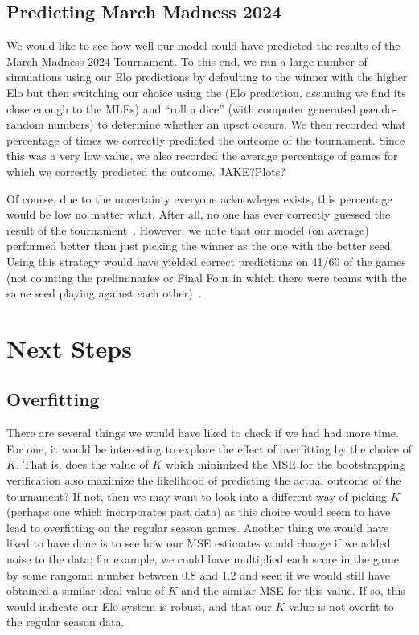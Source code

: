 \documentclass{article}
\begin{document}

\subsection{Predicting March Madness 2024}
We would like to see how well our model could have predicted the results of the March Madness 2024 Tournament. To this end, we ran a large number of simulations using our Elo predictions by defaulting to the winner with the higher Elo but then switching our choice using the (Elo prediction, assuming we find its close enough to the MLEs) and ``roll a dice'' (with computer generated pseudo-random numbers) to determine whether an upset occurs. We then recorded what percentage of times we correctly predicted the outcome of the tournament. Since this was a very low value, we also recorded the average percentage of games for which we correctly predicted the outcome. JAKE?\@ Plots?


Of course, due to the uncertainty everyone acknowleges exists, this percentage would be low no matter what. After all, no one has ever correctly guessed the result of the tournament~\cite{cbsnewsAnyoneEver}. However, we note that our model (on average) performed better than just picking the winner as the one with the better seed. Using this strategy would have yielded correct predictions on 41/60 of the games (not counting the preliminaries or Final Four in which there were teams with the same seed playing against each other)~\cite{wikipedia2024NCAA}.

\section{Next Steps}\label{nextSteps}
\subsection{Overfitting}
There are several things we would have liked to check if we had had more time. For one, it would be interesting to explore the effect of overfitting by the choice of $K$. That is, does the value of $K$ which minimized the MSE for the bootstrapping verification also maximize the likelihood of predicting the actual outcome of the tournament? If not, then we may want to look into a different way of picking $K$ (perhaps one which incorporates past data) as this choice would seem to have lead to overfitting on the regular season games. Another thing we would have liked to have done is to see how our MSE estimates would change if we added noise to the data; for example, we could have multiplied each score in the game by some rangomd number between 0.8 and 1.2 and seen if we would still have obtained a similar ideal value of $K$ and the similar MSE for this value. If so, this would indicate our Elo system is robust, and that our $K$ value is not overfit to the regular season data.
\end{document}
